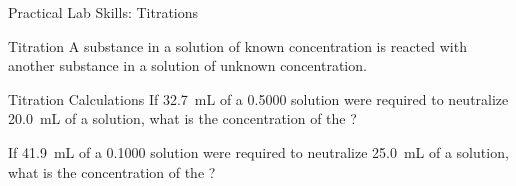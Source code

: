 \documentclass[11pt,letterpaper]{article}
\begin{document}
\begin{frame}{Practical Lab Skills: Titrations}
	\begin{block}{Titration}
		A substance in a solution of known concentration is reacted with
		another substance in a solution of unknown concentration.
	\end{block}

	\begin{overlayarea}{\linewidth}{18em}
	\begin{center}
	\end{center}
	\end{overlayarea}
\end{frame}


\begin{frame}[t]{Titration Calculations}
	If \SI{32.7}{\milli\liter} of a \SI{0.5000}{\Molar}  solution
	were required to neutralize \SI{20.0}{\milli\liter} of a 
	solution, what is the concentration of the ?

\end{frame}

\begin{onyourown}
	If \SI{41.9}{\milli\liter} of a \SI{0.1000}{\Molar}  solution
	were required to neutralize \SI{25.0}{\milli\liter} of a 
	solution, what is the concentration of the ?
\end{onyourown}
\end{document}
